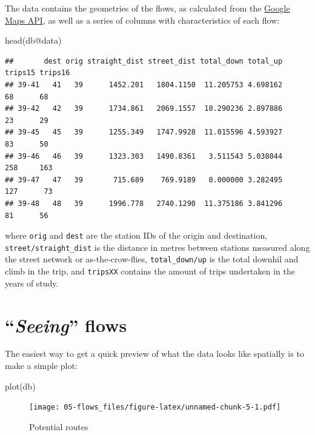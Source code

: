 \documentclass[
]{book}
\newenvironment{Shaded}{\begin{snugshade}}{\end{snugshade}}
\newcommand{\FunctionTok}[1]{\textcolor[rgb]{0.00,0.00,0.00}{#1}}
\newcommand{\NormalTok}[1]{#1}
\newcommand{\SpecialCharTok}[1]{\textcolor[rgb]{0.00,0.00,0.00}{#1}}
\begin{document}
The data contains the geometries of the flows, as calculated from the \href{https://developers.google.com/maps/}{Google Maps API}, as well as a series of columns with characteristics of each flow:

\begin{Shaded}
\begin{Highlighting}[]
\FunctionTok{head}\NormalTok{(db}\SpecialCharTok{@}\NormalTok{data)}
\end{Highlighting}
\end{Shaded}

\begin{verbatim}
##       dest orig straight_dist street_dist total_down total_up trips15 trips16
## 39-41   41   39      1452.201   1804.1150  11.205753 4.698162      68      68
## 39-42   42   39      1734.861   2069.1557  10.290236 2.897886      23      29
## 39-45   45   39      1255.349   1747.9928  11.015596 4.593927      83      50
## 39-46   46   39      1323.303   1490.8361   3.511543 5.038044     258     163
## 39-47   47   39       715.689    769.9189   0.000000 3.282495     127      73
## 39-48   48   39      1996.778   2740.1290  11.375186 3.841296      81      56
\end{verbatim}

where \texttt{orig} and \texttt{dest} are the station IDs of the origin and destination, \texttt{street/straight\_dist} is the distance in metres between stations measured along the street network or as-the-crow-flies, \texttt{total\_down/up} is the total downhil and climb in the trip, and \texttt{tripsXX} contains the amount of trips undertaken in the years of study.

\hypertarget{seeing-flows}{%
\section{\texorpdfstring{``\emph{Seeing}'' flows}{``Seeing'' flows}}\label{seeing-flows}}

The easiest way to get a quick preview of what the data looks like spatially is to make a simple plot:

\begin{Shaded}
\begin{Highlighting}[]
\FunctionTok{plot}\NormalTok{(db)}
\end{Highlighting}
\end{Shaded}

\begin{figure}
\centering
\texttt{[image: 05-flows\_files/figure-latex/unnamed-chunk-5-1.pdf]}
\caption{\label{fig:unnamed-chunk-5}Potential routes}
\end{figure}
\end{document}
